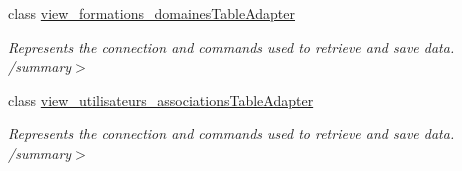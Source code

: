 \begin{DoxyCompactItemize}
class \hyperlink{classforma_1_1formadb_data_set_table_adapters_1_1view__formations__domaines_table_adapter}{view\+\_\+formations\+\_\+domaines\+Table\+Adapter}
\begin{DoxyCompactList}\small\item\em Represents the connection and commands used to retrieve and save data. /summary$>$ \end{DoxyCompactList}\item 
class \hyperlink{classforma_1_1formadb_data_set_table_adapters_1_1view__utilisateurs__associations_table_adapter}{view\+\_\+utilisateurs\+\_\+associations\+Table\+Adapter}
\begin{DoxyCompactList}\small\item\em Represents the connection and commands used to retrieve and save data. /summary$>$ \end{DoxyCompactList}\end{DoxyCompactItemize}
